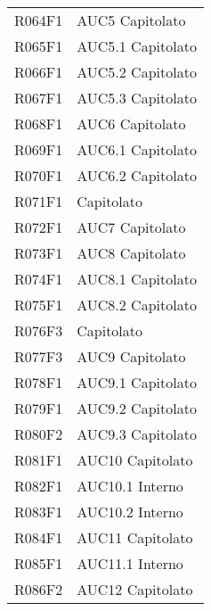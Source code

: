 \documentclass[../analisi-dei-requisiti.tex]{subfiles}
\begin{document}
\begin{longtable}[H]{ p{4cm} | p{4cm} }
  R064F1                               & AUC5 Capitolato               \\
  R065F1                               & AUC5.1 Capitolato             \\
  R066F1                               & AUC5.2 Capitolato             \\
  R067F1                               & AUC5.3 Capitolato             \\
  R068F1                               & AUC6 Capitolato               \\
  R069F1                               & AUC6.1 Capitolato             \\
  R070F1                               & AUC6.2 Capitolato             \\
  R071F1                               & Capitolato                    \\
  R072F1                               & AUC7 Capitolato               \\
  R073F1                               & AUC8 Capitolato               \\
  R074F1                               & AUC8.1 Capitolato             \\
  R075F1                               & AUC8.2 Capitolato             \\
  R076F3                               & Capitolato                    \\
  R077F3                               & AUC9 Capitolato               \\
  R078F1                               & AUC9.1 Capitolato             \\
  R079F1                               & AUC9.2 Capitolato             \\
  R080F2                               & AUC9.3 Capitolato             \\
  R081F1                               & AUC10 Capitolato              \\
  R082F1                               & AUC10.1 Interno               \\
  R083F1                               & AUC10.2 Interno               \\
  R084F1                               & AUC11 Capitolato              \\
  R085F1                               & AUC11.1 Interno               \\
  R086F2                               & AUC12 Capitolato              \\

\end{longtable}
\end{document}
